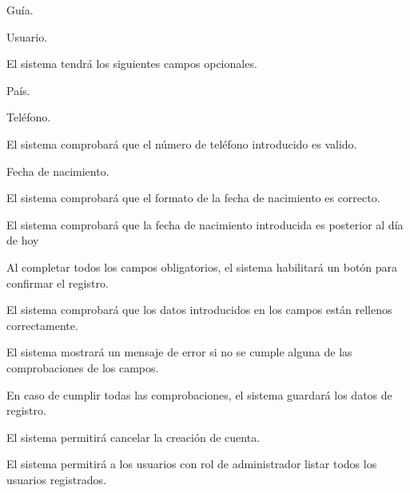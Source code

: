 \begin{enumitem}[label=\bfseries{RAdm \arabic*.},leftmargin=*]
\begin{enumitem}[label*=\bfseries{\arabic*.}]
\begin{enumitem}[label*=\bfseries{\arabic*.}]
\begin{enumitem}[label*=\bfseries{\arabic*.}]
\begin{enumitem}[label*=\bfseries{\arabic*.}]
					\item Guía.
					\item Usuario.
				\end{enumitem}
			\end{enumitem}
		\end{enumitem}
		\item El sistema tendrá los siguientes campos opcionales.
		\begin{enumitem}[label*=\bfseries{\arabic*.}]
			\item País.
			\item Teléfono.
			\begin{enumitem}[label*=\bfseries{\arabic*.}]
				\item El sistema comprobará que el número de teléfono introducido es valido.
			\end{enumitem}
			\item Fecha de nacimiento.
			\begin{enumitem}[label*=\bfseries{\arabic*.}]
				\item El sistema comprobará que el formato de la fecha de nacimiento es correcto.
				\item El sistema comprobará que la fecha de nacimiento introducida es posterior al día de hoy
			\end{enumitem}
		\end{enumitem}
		\item Al completar todos los campos obligatorios, el sistema habilitará un botón para confirmar el registro.
		\begin{enumitem}[label*=\bfseries{\arabic*.}]
			\item El sistema comprobará que los datos introducidos en los campos están rellenos correctamente.
			\begin{enumitem}[label*=\bfseries{\arabic*.}]
				\item El sistema mostrará un mensaje de error si no se cumple alguna de las comprobaciones de los campos.
				\item En caso de cumplir todas las comprobaciones, el sistema guardará los datos de registro.
			\end{enumitem}
		\end{enumitem}
		\item El sistema permitirá cancelar la creación de cuenta.
	\end{enumitem}
	\item El sistema permitirá a los usuarios con rol de administrador listar todos los usuarios registrados.
	\begin{enumitem}[label*=\bfseries{\arabic*.}]

\end{enumitem}
\end{enumitem}
